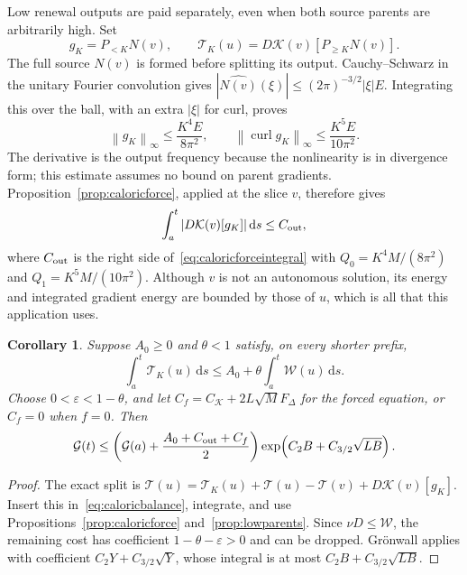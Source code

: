 \documentclass[11pt]{article}
\newtheorem{corollary}[proposition]{Corollary}
\newcommand{\dd}{\,\mathrm d}
\newcommand{\norm}[1]{\left\lVert#1\right\rVert}
\newcommand{\curl}{\operatorname{curl}}
\begin{document}
Low renewal outputs are paid separately, even when both source parents
are arbitrarily high. Set
\[
 g_K=P_{<K}N(v),\qquad
 \mathcal T_K(u)=D\mathcal K(v)[P_{\geq K}N(v)].
\]
The full source $N(v)$ is formed before splitting its output.
Cauchy--Schwarz in the unitary Fourier convolution gives
$|\widehat{N(v)}(\xi)|\leq(2\pi)^{-3/2}|\xi|E$.
Integrating this over the ball, with an extra $|\xi|$ for curl, proves
\begin{equation}\label{eq:lowoutputnorms}
 \norm{g_K}_\infty\leq\frac{K^4E}{8\pi^2},\qquad
 \norm{\curl g_K}_\infty\leq\frac{K^5E}{10\pi^2}.
\end{equation}
The derivative is the output frequency because the nonlinearity is in
divergence form; this estimate assumes no bound on parent gradients.
Proposition~\ref{prop:caloricforce}, applied at the slice $v$, therefore gives
\begin{equation}\label{eq:lowoutputpayment}
 \int_a^t|D\mathcal K(v)[g_K]|\dd s\leq C_{\rm out},
\end{equation}
where $C_{\rm out}$ is the right side of~\eqref{eq:caloricforceintegral}
with $Q_0=K^4M/(8\pi^2)$ and $Q_1=K^5M/(10\pi^2)$.
Although $v$ is not an autonomous solution, its energy and integrated
gradient energy are bounded by those of $u$, which is all that this
application uses.

\begin{corollary}\label{cor:highrenewal}
Suppose $A_0\geq0$ and $\theta<1$ satisfy, on every shorter prefix,
\begin{equation}\label{eq:highrenewaltarget}
 \int_a^t\mathcal T_K(u)\dd s
            \leq A_0+\theta\int_a^t\mathcal W(u)\dd s.
\end{equation}
Choose $0<\varepsilon<1-\theta$, and let
$C_f=C_{\mathcal K}+2L\sqrt M F_\Delta$ for the forced equation, or $C_f=0$
when $f=0$. Then
\[
 \mathcal G(t)\leq
 \left(\mathcal G(a)+\frac{A_0+C_{\rm out}+C_f}{2}\right)
           \exp\!\left(C_2B+C_{3/2}\sqrt{LB}\right).
\]
\end{corollary}
\begin{proof}
The exact split is
$\mathcal T(u)=\mathcal T_K(u)+\mathcal T(u)-\mathcal T(v)
                       +D\mathcal K(v)[g_K]$.
Insert this in~\eqref{eq:caloricbalance}, integrate, and use
Propositions~\ref{prop:caloricforce} and~\ref{prop:lowparents}.
Since $\nu D\leq\mathcal W$, the remaining cost has coefficient
$1-\theta-\varepsilon>0$ and can be dropped. Gr\"onwall applies with
coefficient $C_2Y+C_{3/2}\sqrt Y$, whose integral is at most
$C_2B+C_{3/2}\sqrt{LB}$.
\end{proof}
\end{document}

